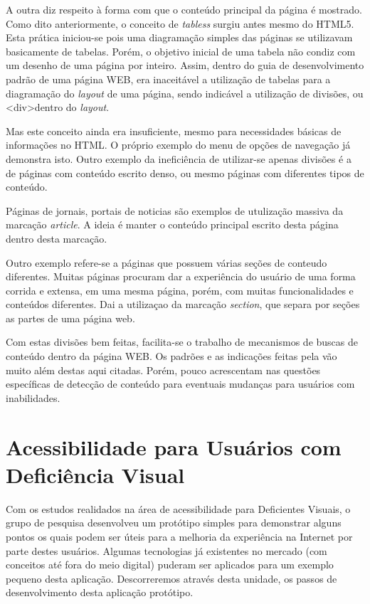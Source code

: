 \documentclass[
	12pt,				%
	oneside,			%
	a4paper,			%
	english,			%
	brazil				%
	]{abntex2ppgsi}
\begin{document}
A outra diz respeito à forma com que o conteúdo principal da página é mostrado. Como dito anteriormente, o conceito de \textit{tabless} surgiu antes mesmo do HTML5. Esta prática iniciou-se pois uma diagramação simples das páginas se utilizavam basicamente de tabelas. Porém, o objetivo inicial de uma tabela não condiz com um desenho de uma página por inteiro. Assim, dentro do guia de desenvolvimento padrão de uma página WEB, era inaceitável a utilização de tabelas para a diagramação do \textit{layout} de uma página, sendo indicável a utilização de divisões, ou \textless div\textgreater dentro do \textit{layout}. 

Mas este conceito ainda era insuficiente, mesmo para necessidades básicas de informações no HTML. O próprio exemplo do menu de opções de navegação já demonstra isto. Outro exemplo da ineficiência de utilizar-se apenas divisões é a de páginas com conteúdo escrito denso, ou mesmo páginas com diferentes tipos de conteúdo. 

Páginas de jornais, portais de noticias são exemplos de utulização massiva da marcação \textit{article}. A ideia é manter o conteúdo principal escrito desta página dentro desta marcação.

Outro exemplo refere-se a páginas que possuem várias seções de conteudo diferentes. Muitas páginas procuram dar a experiência do usuário de uma forma corrida e extensa, em uma mesma página, porém, com muitas funcionalidades e conteúdos diferentes. Dai a utilizaçao da marcação \textit{section}, que separa por seções as partes de uma página web.

Com estas divisões bem feitas, facilita-se o trabalho de mecanismos de buscas de conteúdo dentro da página WEB. Os padrões e as indicações feitas pela  vão muito além destas aqui citadas. Porém, pouco acrescentam nas questões específicas de detecção de conteúdo para eventuais mudanças para usuários com inabilidades.

\chapter{Acessibilidade para Usuários com Deficiência Visual} \label{appCegos}

Com os estudos realidados na área de acessibilidade para Deficientes Visuais, o grupo de pesquisa desenvolveu um protótipo simples para demonstrar alguns pontos os quais podem ser úteis para a melhoria da experiência na Internet por parte destes usuários. Algumas tecnologias já existentes no mercado (com conceitos até fora do meio digital) puderam ser aplicados para um exemplo pequeno desta aplicação. Descorreremos através desta unidade, os passos de desenvolvimento desta aplicação protótipo.
\end{document}
